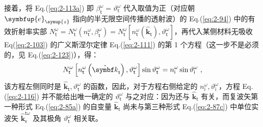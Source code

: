 接着，将 Eq.(\ref{eq:2-113a}) 即 $\beta^\omega_{\mathsf{t}} = \vartheta^{\omega}_{\mathsf{t}}$ 代入取值为正（对应朝 $\symbfup{e}_{\symup{z}}$ 指向的半无限空间传播的透射波）的 Eq.(\ref{eq:2-94}) 中的有效折射率实部 $N^{\omega}_{\mathsf{t}} = N^{\omega}_{\mathsf{t}} \left( n^{\omega}_{\mathsf{t}}, \beta^{\omega}_{\mathsf{t}} \right) = N^{\omega}_{\mathsf{t}} \left[ n^{\omega}_{\mathsf{t}} \left( \hat{\symbf k}_{\mathsf{t}} \right), \vartheta^{\omega}_{\mathsf{t}} \right]$，再代入某侧材料无吸收 Eq(\ref{eq:2-103}) 的广义斯涅尔定律 Eq.(\ref{eq:2-111}) 的第 1 个方程（这一步不是必须的，见 Eq.(\ref{eq:2-123})），得：
\begin{equation} \label{eq:2-116}
	\abovedisplayskip=10pt
	\belowdisplayskip=10pt
	N^{\omega}_{\mathsf{t}} \left[ n^{\omega}_{\mathsf{t}} \left( \hat{\symbf k}_{\mathsf{t}} \right), \vartheta^{\omega}_{\mathsf{t}} \right] \sin \vartheta^{\omega}_{\mathsf{t}} = n^{\omega}_{\mathsf{i}} \sin \vartheta^{\omega}_{\mathsf{i}} ~,
\end{equation}
该方程左侧同时是 $\hat{\symbf k}_{\mathsf{t}}, \vartheta^{\omega}_{\mathsf{t}}$ 的函数，因此，对于方程右侧给定的 $n^{\omega}_{\mathsf{i}}, \vartheta^{\omega}_{\mathsf{i}}$，方程 Eq.(\ref{eq:2-116}) 并不能给出唯一确定的 $\vartheta^{\omega}_{\mathsf{t}}$ 与之对应：因为还与 $\hat{\symbf k}_{\mathsf{t}}$ 有关，而复波矢第一种形式 Eq.(\ref{eq:2-85a}) 的自变量 $\hat{\symbf k}_{\mathsf{t}}$ 尚未与第三种形式 Eq.(\ref{eq:2-87c}) 中单位实波矢 $\hat{\symbf k}_{\mathfrak{r}}^{\mathsf{t}\omega}$ 及其极角 $\vartheta^{\omega}_{\mathsf{t}}$ 相关联。

